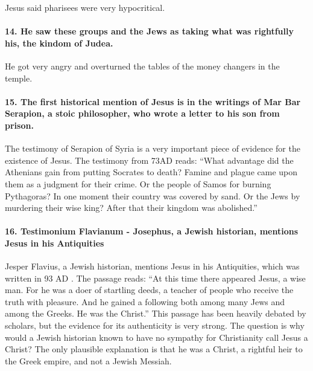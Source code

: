 Jesus said pharisees were very hypocritical.

\paragraph{14.
He saw these groups and the Jews as taking what was rightfully his, the kindom of Judea.}\label{par:he-saw-these-groups-and-the-jews-as-taking-what-was-rightfully-his-the-kindom-of-judea.}

He got very angry and overturned the tables of the money changers in the temple.

\paragraph{15.
The first historical mention of Jesus is in the writings of Mar Bar Serapion, a stoic philosopher, who wrote a letter to his son from prison.}\label{par:the-first-historical-mention-of-jesus-is-in-the-writings-of-mar-bar-serapion-a-stoic-philosopher-who-wrote-a-letter-to-his-son-from-prison.}

The testimony of Serapion of Syria is a very important piece of evidence for the existence of Jesus.
The testimony from 73AD reads: ``What advantage did the Athenians gain from putting Socrates to death?
Famine and plague came upon them as a judgment for their crime.
Or the people of Samos for burning Pythagoras?
In one moment their country was covered by sand.
Or the Jews by murdering their wise king?
After that their kingdom was abolished.''

\paragraph{16.
Testimonium Flavianum - Josephus, a Jewish historian, mentions Jesus in his Antiquities}\label{par:testimonium-flavianum---josephus-a-jewish-historian-mentions-jesus-in-his-antiquities}

Jesper Flavius, a Jewish historian, mentions Jesus in his Antiquities, which was written in 93 AD .
The passage reads: ``At this time there appeared Jesus, a wise man.
For he was a doer of startling deeds, a teacher of people who receive the truth with pleasure.
And he gained a following both among many Jews and among the Greeks.
He was the Christ.'' This passage has been heavily debated by scholars, but the evidence for its authenticity is very strong.
The question is why would a Jewish historian known to have no sympathy for Christianity call Jesus a Christ?
The only plausible explanation is that he was a Christ, a rightful heir to the Greek empire, and not a Jewish Messiah.

